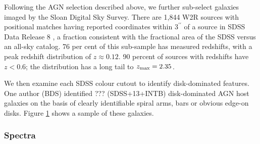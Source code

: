 \begin{figure}
\label{fig:exampleimages}
\end{figure}


Following the AGN selection described above, we further sub-select galaxies imaged by the Sloan Digital Sky Survey. There are 1,844 W2R sources with positional matches having reported coordinates within $3^{\prime \prime}$ of a source in SDSS \citep{york00} Data Release 8 \citep{sdssdr8}, a fraction consistent with the fractional area of the SDSS versus an all-sky catalog. 76 per cent of this sub-sample has measured redshifts, with a peak redshift distribution of $z \approx 0.12$.  90 percent of sources with redshifts have $z < 0.6$; the distribution has a long tail to $z_{\rm max} = 2.35$.

We then examine each SDSS colour cutout to identify disk-dominated features. One author (BDS) identified ??? (SDSS+13+INTB) disk-dominated AGN host galaxies on the basis of clearly identifiable spiral arms, bars or obvious edge-on disks. Figure \ref{fig:exampleimages} shows a sample of these galaxies.



\subsubsection{Spectra}\label{sec:spectra}

